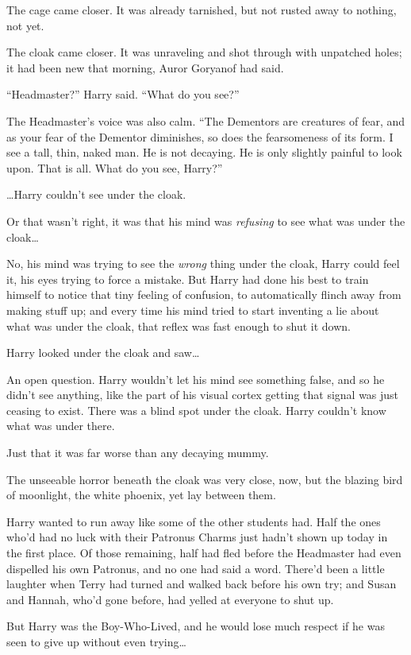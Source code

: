 The cage came closer. It was already tarnished, but not rusted away to
nothing, not yet.

The cloak came closer. It was unraveling and shot through with unpatched
holes; it had been new that morning, Auror Goryanof had said.

``Headmaster?'' Harry said. ``What do you see?''

The Headmaster's voice was also calm. ``The Dementors are creatures of
fear, and as your fear of the Dementor diminishes, so does the
fearsomeness of its form. I see a tall, thin, naked man. He is not
decaying. He is only slightly painful to look upon. That is all. What do
you see, Harry?''

\ldots{}Harry couldn't see under the cloak.

Or that wasn't right, it was that his mind was \emph{refusing} to see
what was under the cloak\ldots{}

No, his mind was trying to see the \emph{wrong} thing under the cloak,
Harry could feel it, his eyes trying to force a mistake. But Harry had
done his best to train himself to notice that tiny feeling of confusion,
to automatically flinch away from making stuff up; and every time his
mind tried to start inventing a lie about what was under the cloak, that
reflex was fast enough to shut it down.

Harry looked under the cloak and saw\ldots{}

An open question. Harry wouldn't let his mind see something false, and
so he didn't see anything, like the part of his visual cortex getting
that signal was just ceasing to exist. There was a blind spot under the
cloak. Harry couldn't know what was under there.

Just that it was far worse than any decaying mummy.

The unseeable horror beneath the cloak was very close, now, but the
blazing bird of moonlight, the white phoenix, yet lay between them.

Harry wanted to run away like some of the other students had. Half the
ones who'd had no luck with their Patronus Charms just hadn't shown up
today in the first place. Of those remaining, half had fled before the
Headmaster had even dispelled his own Patronus, and no one had said a
word. There'd been a little laughter when Terry had turned and walked
back before his own try; and Susan and Hannah, who'd gone before, had
yelled at everyone to shut up.

But Harry was the Boy-Who-Lived, and he would lose much respect if he
was seen to give up without even trying\ldots{}


